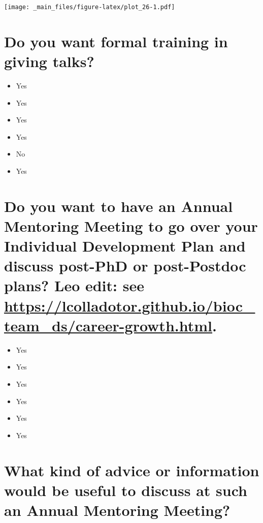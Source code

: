 \documentclass[
]{book}
\providecommand{\tightlist}{%
  \setlength{\itemsep}{0pt}\setlength{\parskip}{0pt}}
\begin{document}
\texttt{[image: \_main\_files/figure-latex/plot\_26-1.pdf]}

\hypertarget{do-you-want-formal-training-in-giving-talks}{%
\section{Do you want formal training in giving talks?}\label{do-you-want-formal-training-in-giving-talks}}

\begin{itemize}
\tightlist
\item
  Yes
\item
  Yes
\item
  Yes
\item
  Yes
\item
  No
\item
  Yes
\end{itemize}

\hypertarget{do-you-want-to-have-an-annual-mentoring-meeting-to-go-over-your-individual-development-plan-and-discuss-post-phd-or-post-postdoc-plans-leo-edit-see-httpslcolladotor.github.iobioc_team_dscareer-growth.html.}{%
\section{\texorpdfstring{Do you want to have an Annual Mentoring Meeting to go over your Individual Development Plan and discuss post-PhD or post-Postdoc plans? Leo edit: see \url{https://lcolladotor.github.io/bioc_team_ds/career-growth.html}.}{Do you want to have an Annual Mentoring Meeting to go over your Individual Development Plan and discuss post-PhD or post-Postdoc plans? Leo edit: see https://lcolladotor.github.io/bioc\_team\_ds/career-growth.html.}}\label{do-you-want-to-have-an-annual-mentoring-meeting-to-go-over-your-individual-development-plan-and-discuss-post-phd-or-post-postdoc-plans-leo-edit-see-httpslcolladotor.github.iobioc_team_dscareer-growth.html.}}

\begin{itemize}
\tightlist
\item
  Yes
\item
  Yes
\item
  Yes
\item
  Yes
\item
  Yes
\item
  Yes
\end{itemize}

\hypertarget{what-kind-of-advice-or-information-would-be-useful-to-discuss-at-such-an-annual-mentoring-meeting}{%
\section{What kind of advice or information would be useful to discuss at such an Annual Mentoring Meeting?}\label{what-kind-of-advice-or-information-would-be-useful-to-discuss-at-such-an-annual-mentoring-meeting}}
\end{document}
